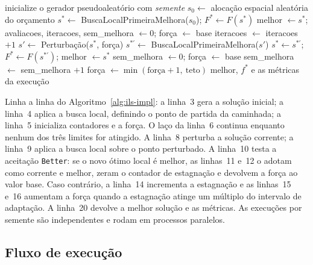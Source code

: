 \documentclass[11pt,a4paper]{article}
\newcommand{\code}[1]{\texttt{#1}}
\begin{document}
\begin{algorithm}[t]
\caption{ILS implementado, por semente (maximização de $\sum \text{IQC}$)}
\label{alg:ils-impl}
\begin{algorithmic}[1]
  \State inicialize o gerador pseudoaleatório com \emph{semente}
  \State $s_0 \gets$ alocação espacial aleatória do orçamento
  \State $s^\ast \gets$ BuscaLocalPrimeiraMelhora($s_0$); \quad $F^\ast \gets F(s^\ast)$
  \State melhor $\gets s^\ast$; \quad avaliacoes, iteracoes, sem\_melhora $\gets 0$; \quad força $\gets$ base
    \State iteracoes $\gets$ iteracoes $+ 1$
    \State $s' \gets$ Perturbação($s^\ast$, força) 
    \State $s^{\ast\prime} \gets$ BuscaLocalPrimeiraMelhora($s'$) 
     \Comment{aceitação \code{Better}}
      \State $s^\ast \gets s^{\ast\prime}$; \quad $F^\ast \gets F(s^{\ast\prime})$; \quad melhor $\gets s^\ast$
      \State sem\_melhora $\gets 0$; \quad força $\gets$ base
    \Else
      \State sem\_melhora $\gets$ sem\_melhora $+ 1$
        \State força $\gets \min(\text{força}+1,\ \text{teto})$
      \EndIf
    \EndIf
  \EndWhile
  \State \Return melhor, $f^\ast$ e as métricas da execução
\EndProcedure
\end{algorithmic}
\end{algorithm}

Linha a linha do Algoritmo~\ref{alg:ils-impl}: a linha~3 gera a solução inicial; a linha~4 aplica a busca local, definindo o ponto de partida da caminhada; a linha~5 inicializa contadores e a força. O laço da linha~6 continua enquanto nenhum dos três limites for atingido. A linha~8 perturba a solução corrente; a linha~9 aplica a busca local sobre o ponto perturbado. A linha~10 testa a aceitação \code{Better}: se o novo ótimo local é melhor, as linhas~11 e~12 o adotam como corrente e melhor, zeram o contador de estagnação e devolvem a força ao valor base. Caso contrário, a linha~14 incrementa a estagnação e as linhas~15 e~16 aumentam a força quando a estagnação atinge um múltiplo do intervalo de adaptação. A linha~20 devolve a melhor solução e as métricas. As execuções por semente são independentes e rodam em processos paralelos.

\subsection{Fluxo de execução}
\end{document}
